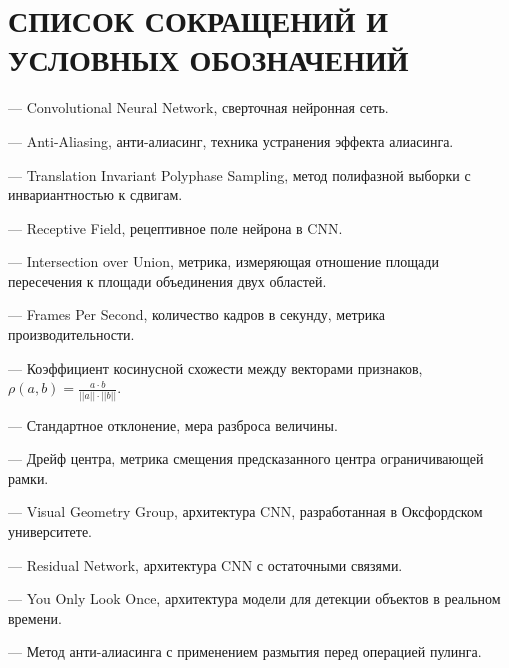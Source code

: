 \chapter*{СПИСОК СОКРАЩЕНИЙ И УСЛОВНЫХ ОБОЗНАЧЕНИЙ}

\begin{description}[leftmargin=3cm,style=sameline]
    \item[CNN] --- Convolutional Neural Network, сверточная нейронная сеть.
    \item[AA] --- Anti-Aliasing, анти-алиасинг, техника устранения эффекта алиасинга.
    \item[TIPS] --- Translation Invariant Polyphase Sampling, метод полифазной выборки с инвариантностью к сдвигам.
    \item[RF] --- Receptive Field, рецептивное поле нейрона в CNN.
    \item[IoU] --- Intersection over Union, метрика, измеряющая отношение площади пересечения к площади объединения двух областей.
    \item[FPS] --- Frames Per Second, количество кадров в секунду, метрика производительности.
    \item[$\rho$] --- Коэффициент косинусной схожести между векторами признаков, $\rho(a,b) = \frac{a \cdot b}{||a|| \cdot ||b||}$.
    \item[$\sigma$] --- Стандартное отклонение, мера разброса величины.
    \item[$\Delta_{c}$] --- Дрейф центра, метрика смещения предсказанного центра ограничивающей рамки.
    \item[VGG] --- Visual Geometry Group, архитектура CNN, разработанная в Оксфордском университете.
    \item[ResNet] --- Residual Network, архитектура CNN с остаточными связями.
    \item[YOLO] --- You Only Look Once, архитектура модели для детекции объектов в реальном времени.
    \item[BlurPool] --- Метод анти-алиасинга с применением размытия перед операцией пулинга.
\end{description} 